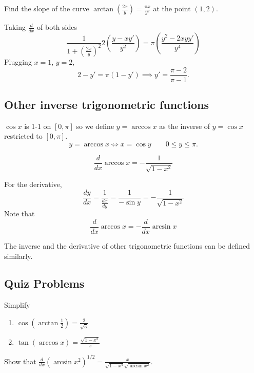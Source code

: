 \documentclass[../calc1-main.tex]{subfiles}
\begin{document}
\begin{example}
  Find the slope of the curve $\arctan\left( \frac{2x}{y} \right) = \frac{\pi x}{y^2}$ at the point $(1, 2)$.
\end{example}

\begin{solution}
  Taking $\frac{d}{dx}$ of both sides
  \[
    \frac{1}{1+\left( \frac{2x}{y} \right)^2} 2\left( \frac{y-x y'}{y^2} \right) = \pi \left( \frac{y^2 - 2x y y'}{y^4} \right)
  \]
  Plugging $x=1$, $y=2$,
  \[
    2- y' = \pi (1- y') \implies y' = \frac{\pi-2}{\pi-1}.
  \]
\end{solution}

\subsection*{Other inverse trigonometric functions}
$\cos x$ is 1-1 on $[0, \pi]$ so we define $y=\arccos x$ as the inverse of $y=\cos x$ restricted to $[0, \pi]$.
\[
  y = \arccos x \iff x = \cos y \qquad 0 \le y \le \pi.
\]

\begin{theorem}
  \[
    \frac{d}{dx} \arccos x = -\frac{1}{\sqrt{1-x^2}}
  \]

\end{theorem}
For the derivative,
\[
  \frac{dy}{dx} = \frac{1}{\frac{dx}{dy}} = \frac{1}{-\sin y} = -\frac{1}{\sqrt{1-x^2}}
\]
Note that
\[
  \frac{d}{dx} \arccos x = -\frac{d}{dx} \arcsin x
\]


The inverse and the derivative of other trigonometric functions can be defined similarly.

\subsection*{Quiz Problems}
\begin{example}
  Simplify
  \begin{enumerate}
    \item $\cos(\arctan \frac{1}{2}) = \frac{2}{\sqrt{5}}$

    \item $\tan (\arccos x)= \frac{\sqrt{1-x^2}}{x}$

  \end{enumerate}
\end{example}
\begin{example}
  Show that $\frac{d}{dx}(\arcsin x^2)^{1/2} = \frac{x}{\sqrt{1-x^4}\sqrt{\arcsin x^2}}$.
\end{example}

\end{document}
